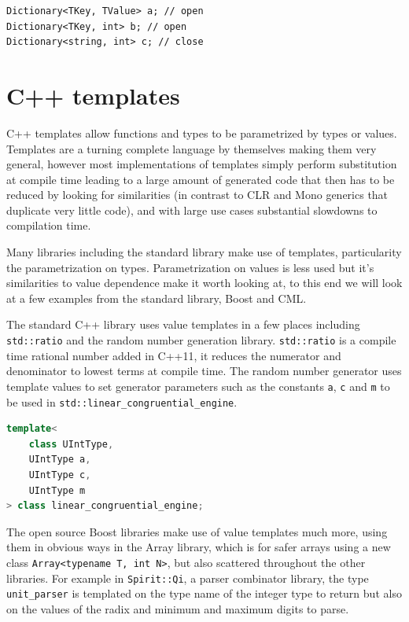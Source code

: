 \documentclass[english]{report}
\begin{document}
\begin{lstlisting}[caption={Open and closed type in C\# syntax},keywordstyle={\color{blue}},language=sharpc]
Dictionary<TKey, TValue> a; // open
Dictionary<TKey, int> b; // open
Dictionary<string, int> c; // close
\end{lstlisting}



\section{C++ templates\label{sec:Cpp-templates}}

C++ templates allow functions and types to be parametrized by types
or values. Templates are a turning complete language by themselves
making them very general, however most implementations of templates
simply perform substitution at compile time leading to a large amount
of generated code that then has to be reduced by looking for similarities
(in contrast to CLR and Mono generics that duplicate very little code),
and with large use cases substantial slowdowns to compilation time.

Many libraries including the standard library make use of templates,
particularity the parametrization on types. Parametrization on values
is less used but it's similarities to value dependence make it worth
looking at, to this end we will look at a few examples from the standard
library, Boost\cite{boost} and CML\cite{cmldev}. 

The standard C++ library uses value templates in a few places including
\texttt{std::ratio} and the random number generation library. \texttt{std::ratio}
is a compile time rational number added in C++11, it reduces the numerator
and denominator to lowest terms at compile time. The random number
generator uses template values to set generator parameters such as
the constants \texttt{a}, \texttt{c} and \texttt{m} to be used in
\texttt{std::linear\_congruential\_engine}.

\begin{lstlisting}[keywordstyle={\color{blue}},language={C++}]
template<
	class UIntType, 
	UIntType a, 
	UIntType c, 
	UIntType m 
> class linear_congruential_engine;
\end{lstlisting}


The open source Boost\cite{boost} libraries make use of value templates
much more, using them in obvious ways in the Array library, which
is for safer arrays using a new class \texttt{Array<typename T, int
N>}, but also scattered throughout the other libraries. For example
in \texttt{Spirit::Qi}, a parser combinator library, the type \texttt{unit\_parser}
is templated on the type name of the integer type to return but also
on the values of the radix and minimum and maximum digits to parse. 
\end{document}
